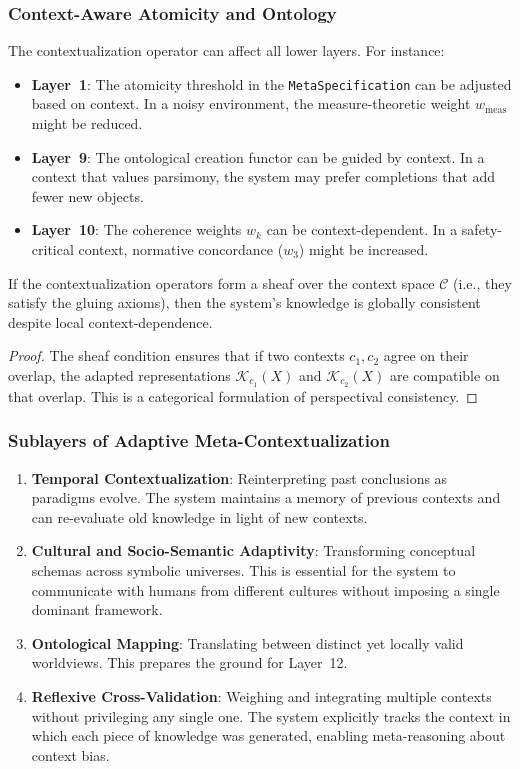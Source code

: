 \subsubsection{Context-Aware Atomicity and Ontology}
The contextualization operator can affect all lower layers. For instance:
\begin{itemize}
    \item \textbf{Layer~1}: The atomicity threshold in the \texttt{MetaSpecification} can be adjusted based on context. In a noisy environment, the measure-theoretic weight $w_{\text{meas}}$ might be reduced.
    \item \textbf{Layer~9}: The ontological creation functor can be guided by context. In a context that values parsimony, the system may prefer completions that add fewer new objects.
    \item \textbf{Layer~10}: The coherence weights $w_k$ can be context-dependent. In a safety-critical context, normative concordance ($w_3$) might be increased.
\end{itemize}

\begin{proposition}
If the contextualization operators form a sheaf over the context space $\mathcal{C}$ (i.e., they satisfy the gluing axioms), then the system's knowledge is globally consistent despite local context-dependence.
\end{proposition}
\begin{proof}
The sheaf condition ensures that if two contexts $c_1, c_2$ agree on their overlap, the adapted representations $\mathcal{K}_{c_1}(X)$ and $\mathcal{K}_{c_2}(X)$ are compatible on that overlap. This is a categorical formulation of perspectival consistency.
\end{proof}

\subsubsection{Sublayers of Adaptive Meta-Contextualization}
\begin{enumerate}
    \item \textbf{Temporal Contextualization}: Reinterpreting past conclusions as paradigms evolve. The system maintains a memory of previous contexts and can re-evaluate old knowledge in light of new contexts.
    \item \textbf{Cultural and Socio-Semantic Adaptivity}: Transforming conceptual schemas across symbolic universes. This is essential for the system to communicate with humans from different cultures without imposing a single dominant framework.
    \item \textbf{Ontological Mapping}: Translating between distinct yet locally valid worldviews. This prepares the ground for Layer~12.
    \item \textbf{Reflexive Cross-Validation}: Weighing and integrating multiple contexts without privileging any single one. The system explicitly tracks the context in which each piece of knowledge was generated, enabling meta-reasoning about context bias.
\end{enumerate}


